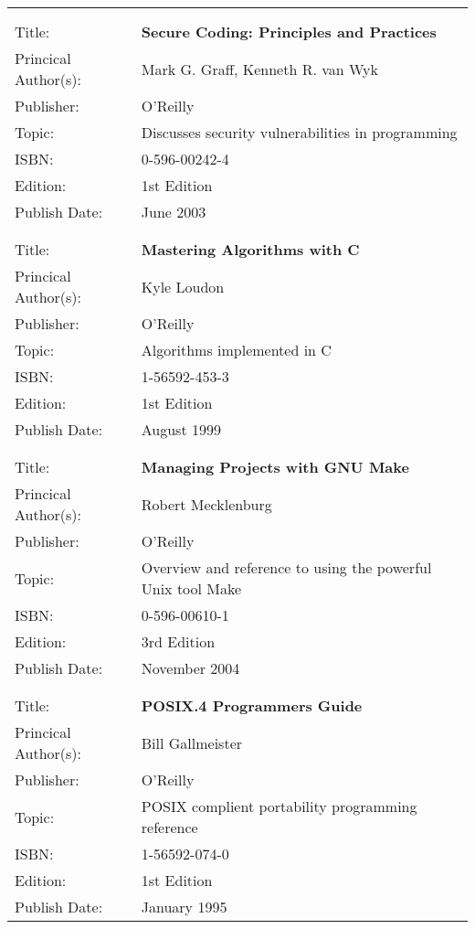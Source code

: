 \documentclass[a4paper,12pt]{article}
\begin{document}
\begin{tabular}{ll}
	&	\\
	&	\\

Title: &	\textbf{Secure Coding: Principles and Practices}	\\
Princical Author(s): &	Mark G. Graff, Kenneth R. van Wyk  \\
Publisher:&	O'Reilly	\\	
Topic:	&	Discusses security vulnerabilities in programming \\
ISBN:		&	0-596-00242-4 \\
Edition:	&	1st Edition \\
Publish Date:	&	June 2003 \\

	&	\\
	&	\\

Title: &	\textbf{Mastering Algorithms with C}	\\
Princical Author(s): &	Kyle Loudon  \\
Publisher:&	O'Reilly	\\	
Topic:	&	Algorithms implemented in C \\
ISBN:		&	1-56592-453-3 \\
Edition:	&	1st Edition \\
Publish Date:	&	August 1999 \\

	&	\\
	&	\\

Title: &	\textbf{Managing Projects with GNU Make}	\\
Princical Author(s): &	Robert Mecklenburg  \\
Publisher:&	O'Reilly	\\	
Topic:	&	Overview and reference to using the powerful Unix tool Make \\
ISBN:		&	0-596-00610-1 \\
Edition:	&	3rd Edition \\
Publish Date:	&	November 2004 \\

	&	\\
	&	\\
	
Title: &	\textbf{POSIX.4 Programmers Guide}	\\
Princical Author(s): &	Bill Gallmeister  \\
Publisher:&	O'Reilly	\\	
Topic:	&	POSIX complient portability programming reference \\
ISBN:		&	1-56592-074-0 \\
Edition:	&	1st Edition \\
Publish Date:	&	January 1995 \\


\end{tabular}
\end{document}
